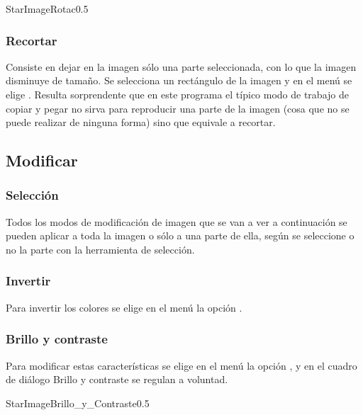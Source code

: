 \begin{figura}{StarImageRotac}{0.5}
\caption{Rotación}
\label{fig:StarImageRotac}
\end{figura}


\subsubsection{Recortar}
Consiste en dejar en la imagen sólo una parte seleccionada, con lo que la imagen disminuye de tamaño.
Se selecciona un rectángulo de la imagen y en el menú  se elige .
Resulta sorprendente que en este programa el típico modo de trabajo de copiar y pegar no sirva para
reproducir una parte de la imagen (cosa que no se puede realizar de ninguna forma) sino que equivale
a recortar.


\subsection{Modificar}
\subsubsection{Selección}
Todos los modos de modificación de imagen que se van a ver a continuación se pueden aplicar a toda 
la imagen o sólo a una parte de ella, según se seleccione o no la parte con la herramienta de
selección.

\subsubsection{Invertir}
Para invertir los colores se elige en el menú  la opción .

\subsubsection{Brillo y contraste}
Para modificar estas características se elige en el menú  la opción ,
y en el cuadro de diálogo Brillo y contraste se regulan a voluntad.

\begin{figura}{StarImageBrillo_y_Contraste}{0.5}
\caption{Brillo y contraste}
\label{fig:StarImageBrillo_y_Contraste}
\end{figura}

